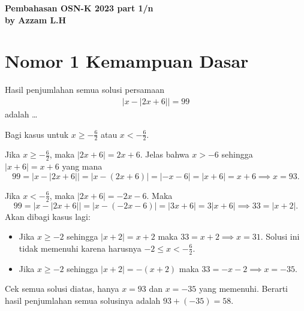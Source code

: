 \begin{center}
    \textbf{\Huge Pembahasan OSN-K 2023 part 1/n}\\
    \textbf{\large by Azzam L.H}
\end{center}


\vspace{-1.5cm}


\section{Nomor 1 Kemampuan Dasar}
Hasil penjumlahan semua solusi persamaan
\begin{align*}
|x-|2x+6||=99
\end{align*}
adalah \dots
\begin{solusi}
Bagi kasus untuk $x \ge -\tfrac{6}{2}$ atau $x < -\tfrac{6}{2}$.

Jika $x \ge -\tfrac{6}{2}$, maka $|2x+6| = 2x+6$. Jelas bahwa $x > -6$ sehingga $|x+6|=x+6$ yang mana
$$99=|x-|2x+6||=|x-(2x+6)|=|-x-6|=|x+6|=x+6 \implies x = 93.$$

Jika $x < -\tfrac{6}{2}$, maka $|2x+6| = -2x-6$. Maka
$$99=|x-|2x+6||=|x-(-2x-6)|=|3x+6|=3|x+6| \implies 33=|x+2|.$$
Akan dibagi kasus lagi:
\begin{itemize}
\item Jika $x \ge -2$ sehingga $|x+2|=x+2$ maka $33=x+2 \implies x=31$. Solusi ini tidak memenuhi karena harusnya $-2 \le x < -\tfrac{6}{2}$.
\item Jika $x \ge -2$ sehingga $|x+2|=-(x+2)$ maka $33=-x-2 \implies x=-35$.
\end{itemize}
Cek semua solusi diatas, hanya $x=93$ dan $x=-35$ yang memenuhi. Berarti hasil penjumlahan semua solusinya adalah $93+(-35)=\boxed{58}$.

\end{solusi}

